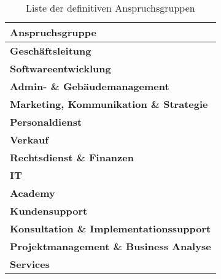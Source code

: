 \documentclass[../../main.tex]{subfiles}
\begin{document}

\begin{table}[H]
\tablefontsize	
\caption{Liste der definitiven Anspruchsgruppen}
\label{definitive_anspruchsgruppen}


\begin{tabular}{ |p{8cm}| }


\hline
\tableheaderbgcolor
\textbf{Anspruchsgruppe} \\ 
\hline


\textbf{Geschäftsleitung}                       \\ \hline
\textbf{Softwareentwicklung}                    \\ \hline
\textbf{Admin- \& Gebäudemanagement}            \\ \hline
\textbf{Marketing, Kommunikation \& Strategie}  \\ \hline
\textbf{Personaldienst}                         \\ \hline
\textbf{Verkauf}                                \\ \hline
\textbf{Rechtsdienst \& Finanzen}               \\ \hline
\textbf{IT}                   \\ \hline
\textbf{Academy}                                \\ \hline
\textbf{Kundensupport}                          \\ \hline
\textbf{Konsultation \& Implementationssupport} \\ \hline
\textbf{Projektmanagement \& Business Analyse}  \\ \hline
\textbf{Services}                               \\ \hline

\end{tabular}
\end{table}
\end{document}
